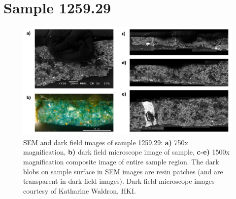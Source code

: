\section{Sample 1259.29}

\begin{figure}[H]
  \centering
  \includegraphics[width=0.8\linewidth]{1259.29_imgs}
\caption[SEM and dark field images of sample 1259.29.]{SEM and dark field images of sample 1259.29: \textbf{a)} 750x magnification, \textbf{b)} dark field microscope image of sample, \textbf{c-e)} 1500x magnification composite image of entire sample region. The dark blobs on sample surface in SEM images are resin patches (and are transparent in dark field images). Dark field microscope images courtesy of Katharine Waldron, HKI.}
\label{fig:1259.29_imgs}
\end{figure}

